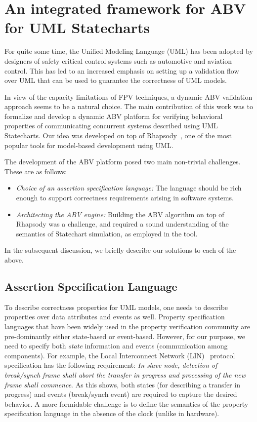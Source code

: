 \documentclass[a4paper, 11pt]{article}
\begin{document}
\section{An integrated framework for ABV for UML Statecharts} \label{sec7}
For quite some time, the Unified Modeling Language (UML) has been
adopted by designers of safety critical control systems such as
automotive and aviation control. This has led to an increased emphasis
on setting up a validation flow~\cite{room} over UML that can be used to 
guarantee the correctness of UML models.

In view of the capacity limitations of FPV techniques, a dynamic ABV 
validation approach seems to be a natural choice.
The main contribution of this work was to formalize and develop a dynamic 
ABV platform for verifying behavioral properties of communicating
concurrent systems described using UML Statecharts. Our idea was 
developed on top of Rhapsody~\cite{rhap}, one of the most popular 
tools for model-based development using UML. 

The development of the ABV platform posed two main non-trivial challenges.
These are as follows:

\begin{itemize}

\item {\em Choice of an assertion specification language:} The language 
	should be rich enough to support correctness requirements arising in
    software systems.

\item {\em Architecting the ABV engine:} Building the ABV algorithm on top 
	of Rhapsody was a challenge, and required a sound understanding of 
	the semantics of Statechart simulation, as employed in the tool.

\end{itemize}

\noindent
In the subsequent discussion, we briefly describe our solutions to 
each of the above.

\subsection{Assertion Specification Language} \label{sec7.1}
To describe correctness properties for UML models, one needs to 
describe properties over data attributes and events as well.
Property specification languages that have been widely used in
the property verification community are pre-dominantly either
state-based or event-based. However, for our purpose, we need
to specify both {\em state} information and events (communication
among components). For example, the Local Interconnect Network
(LIN)~\cite{lin} protocol specification has the following requirement:
{\em In slave node, detection of break/synch frame shall abort
the transfer in progress and processing of the new frame shall
commence}. As this shows, both states (for describing a transfer in progress)
and events (break/synch event) are required to
capture the desired behavior. A more formidable 
challenge is to define the semantics of the property specification 
language in the absence of the clock (unlike in hardware). 
\end{document}
